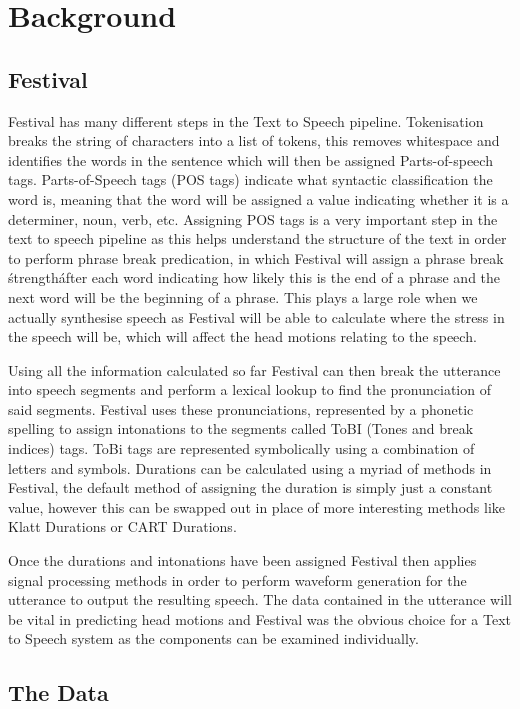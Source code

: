 \documentclass[bsc,frontabs,twoside,singlespacing,parskip]{infthesis}     %
\begin{document}
\chapter{Background}
\section{Festival}
Festival has many different steps in the Text to Speech pipeline. Tokenisation breaks the string of characters into a list of tokens, this removes whitespace and identifies the words in the sentence which will then be assigned Parts-of-speech tags. Parts-of-Speech tags (POS tags) indicate what syntactic classification the word is, meaning that the word will be assigned a value indicating whether it is a determiner, noun, verb, etc. Assigning POS tags is a very important step in the text to speech pipeline as this helps understand the structure of the text in order to perform phrase break predication, in which Festival will assign a phrase break \'strength\' after each word indicating how likely this is the end of a phrase and the next word will be the beginning of a phrase. This plays a large role when we actually synthesise speech as Festival will be able to calculate where the stress in the speech will be, which will affect the head motions relating to the speech.

Using all the information calculated so far Festival can then break the utterance into speech segments and perform a lexical lookup to find the pronunciation of said segments. Festival uses these pronunciations, represented by a phonetic spelling to assign intonations to the segments called ToBI (Tones and break indices) tags. ToBi tags are represented symbolically using a combination of letters and symbols. Durations can be calculated using a myriad of methods in Festival, the default method of assigning the duration is simply just a constant value, however this can be swapped out in place of more interesting methods like Klatt Durations or CART Durations. 

Once the durations and intonations have been assigned Festival then applies signal processing methods in order to perform waveform generation for the utterance to output the resulting speech. The data contained in the utterance will be vital in predicting head motions and Festival was the obvious choice for a Text to Speech system as the components can be examined individually.
\section{The Data}
\end{document}
